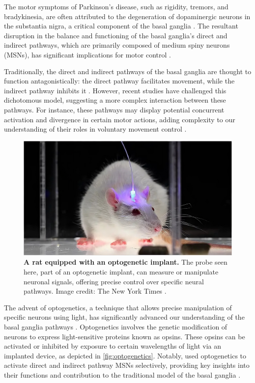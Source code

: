 \documentclass[10pt]{article}
\begin{document}
\begin{sloppypar}
  The motor symptoms of Parkinson’s disease, such as rigidity, tremors, and bradykinesia, are often attributed to the degeneration of dopaminergic neurons in the substantia nigra, a critical component of the basal ganglia \citep{abedini_cooccurrence_2015}. The resultant disruption in the balance and functioning of the basal ganglia’s direct and indirect pathways, which are primarily composed of medium spiny neurons (MSNs), has significant implications for motor control \cite{abedini_cooccurrence_2015,ojagbemi_neuropsychiatric_2013}.

  Traditionally, the direct and indirect pathways of the basal ganglia are thought to function antagonistically: the direct pathway facilitates movement, while the indirect pathway inhibits it \citep{isett_indirect_2022}. However, recent studies have challenged this dichotomous model, suggesting a more complex interaction between these pathways. For instance, these pathways may display potential concurrent activation and divergence in certain motor actions, adding complexity to our understanding of their roles in voluntary movement control \citep{perez_striatal_2017}.

  \begin{figure}[ht]
    \centering
    \includegraphics[width=\textwidth]{figures/optogenetics.png}
    \caption[A rat equipped with an optogenetic implant]{\textbf{A rat equipped with an optogenetic implant.} The probe seen here, part of an optogenetic implant, can measure or manipulate neuronal signals, offering precise control over specific neural pathways. Image credit: The New York Times \citep{belluck_risky_2016}.}
    \label{fig:optogenetics}
  \end{figure}

  The advent of optogenetics, a technique that allows precise manipulation of specific neurons using light, has significantly advanced our understanding of the basal ganglia pathways \citep{deisseroth_next-generation_2006}. Optogenetics involves the genetic modification of neurons to express light-sensitive proteins known as opsins. These opsins can be activated or inhibited by exposure to certain wavelengths of light via an implanted device, as depicted in \autoref{fig:optogenetics}. Notably,  used optogenetics to activate direct and indirect pathway MSNs selectively, providing key insights into their functions and contribution to the traditional model of the basal ganglia \citep{kravitz_regulation_2010}.


\end{sloppypar}
\end{document}
